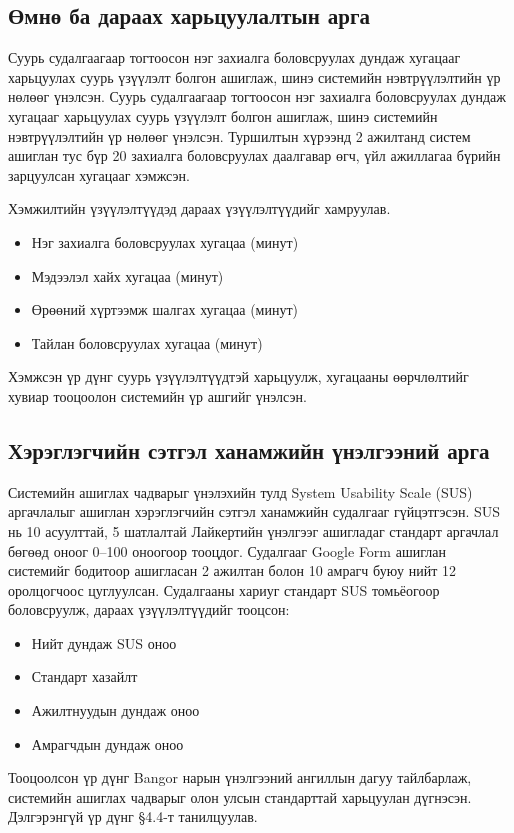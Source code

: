 \subsection{Өмнө ба дараах харьцуулалтын арга}

Суурь судалгаагаар тогтоосон нэг захиалга боловсруулах дундаж хугацааг харьцуулах суурь үзүүлэлт болгон ашиглаж, шинэ системийн нэвтрүүлэлтийн үр нөлөөг үнэлсэн. Суурь судалгаагаар тогтоосон нэг захиалга боловсруулах дундаж хугацааг харьцуулах суурь үзүүлэлт болгон ашиглаж, шинэ системийн нэвтрүүлэлтийн үр нөлөөг үнэлсэн. Туршилтын хүрээнд 2 ажилтанд систем ашиглан тус бүр 20 захиалга боловсруулах даалгавар өгч, үйл ажиллагаа бүрийн зарцуулсан хугацааг хэмжсэн.

Хэмжилтийн үзүүлэлтүүдэд дараах үзүүлэлтүүдийг хамруулав.

\begin{itemize}
    \item Нэг захиалга боловсруулах хугацаа (минут)
    \item Мэдээлэл хайх хугацаа (минут)
    \item Өрөөний хүртээмж шалгах хугацаа (минут)
    \item Тайлан боловсруулах хугацаа (минут)
\end{itemize}

Хэмжсэн үр дүнг суурь үзүүлэлтүүдтэй харьцуулж, хугацааны өөрчлөлтийг хувиар тооцоолон системийн үр ашгийг үнэлсэн.

\subsection{Хэрэглэгчийн сэтгэл ханамжийн үнэлгээний арга}

Системийн ашиглах чадварыг үнэлэхийн тулд System Usability Scale (SUS) аргачлалыг \cite{brooke1996sus} ашиглан хэрэглэгчийн сэтгэл ханамжийн судалгааг гүйцэтгэсэн. SUS нь 10 асуулттай, 5 шатлалтай Лайкертийн үнэлгээг ашигладаг стандарт аргачлал бөгөөд оноог 0--100 оноогоор тооцдог. Судалгааг Google Form ашиглан системийг бодитоор ашигласан 2 ажилтан болон 10 амрагч буюу нийт 12 оролцогчоос цуглуулсан.
Судалгааны хариуг стандарт SUS томьёогоор боловсруулж, дараах үзүүлэлтүүдийг тооцсон:
\begin{itemize}
  \item Нийт дундаж SUS оноо
  \item Стандарт хазайлт
  \item Ажилтнуудын дундаж оноо
  \item Амрагчдын дундаж оноо
\end{itemize}
Тооцоолсон үр дүнг Bangor нарын \cite{bangor2008sus} үнэлгээний ангиллын дагуу тайлбарлаж, системийн ашиглах чадварыг олон улсын стандарттай харьцуулан дүгнэсэн. Дэлгэрэнгүй үр дүнг §4.4-т танилцуулав.
